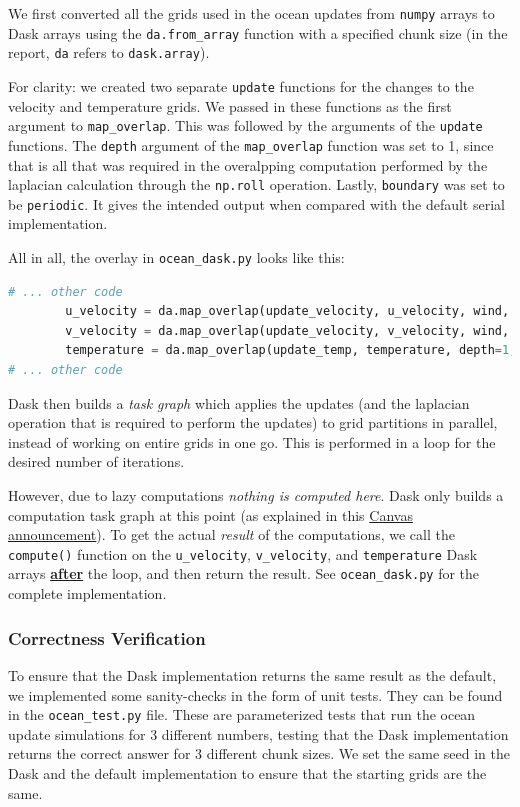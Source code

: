\documentclass[a4paper,12pt]{article}
\begin{document}
We first converted all the grids used in the ocean updates from \verb|numpy| arrays to Dask arrays using the \verb|da.from_array| function with a specified chunk size (in the report, \verb|da| refers to \verb|dask.array|). 

For clarity: we created two separate \verb|update| functions for the changes to the velocity and temperature grids.
We passed in these functions as the first argument to \verb|map_overlap|.
This was followed by the arguments of the \verb|update| functions.
The \verb|depth| argument of the \verb|map_overlap| function was set to 1, since that is all that was required in the overalpping computation performed by the laplacian calculation through the \verb|np.roll| operation.
Lastly, \verb|boundary| was set to be \verb|periodic|.
It gives the intended output when compared with the default serial implementation.

All in all, the overlay in \verb|ocean_dask.py| looks like this:

\begin{lstlisting}[language=python,basicstyle=\tiny\ttfamily]
# ... other code
        u_velocity = da.map_overlap(update_velocity, u_velocity, wind, depth=1, boundary="periodic", dtype=da.float64)
        v_velocity = da.map_overlap(update_velocity, v_velocity, wind, depth=1, boundary="periodic", dtype=da.float64)
        temperature = da.map_overlap(update_temp, temperature, depth=1, boundary="periodic", dtype=da.float64)
# ... other code

\end{lstlisting}

Dask then builds a \textit{task graph} which applies the updates (and the laplacian operation that is required to perform the updates) to grid partitions in parallel, instead of working on entire grids in one go.
This is performed in a loop for the desired number of iterations. 

However, due to lazy computations \textit{nothing is computed here}.
Dask only builds a computation task graph at this point (as explained in this \href{https://canvas.kth.se/courses/52247/discussion_topics/452810}{Canvas announcement}).
To get the actual \textit{result} of the computations, we call the \verb|compute()| function on the \verb|u_velocity|, \verb|v_velocity|, and \verb|temperature| Dask arrays \textbf{\underline{after}} the loop, and then return the result.
See \verb|ocean_dask.py| for the complete implementation.

\subsubsection{Correctness Verification}
To ensure that the Dask implementation returns the same result as the default, we implemented some sanity-checks in the form of unit tests.
They can be found in the \verb|ocean_test.py| file.
These are parameterized tests that run the ocean update simulations for 3 different numbers, testing that the Dask implementation returns the correct answer for 3 different chunk sizes.
We set the same seed in the Dask and the default implementation to ensure that the starting grids are the same. 
\end{document}
